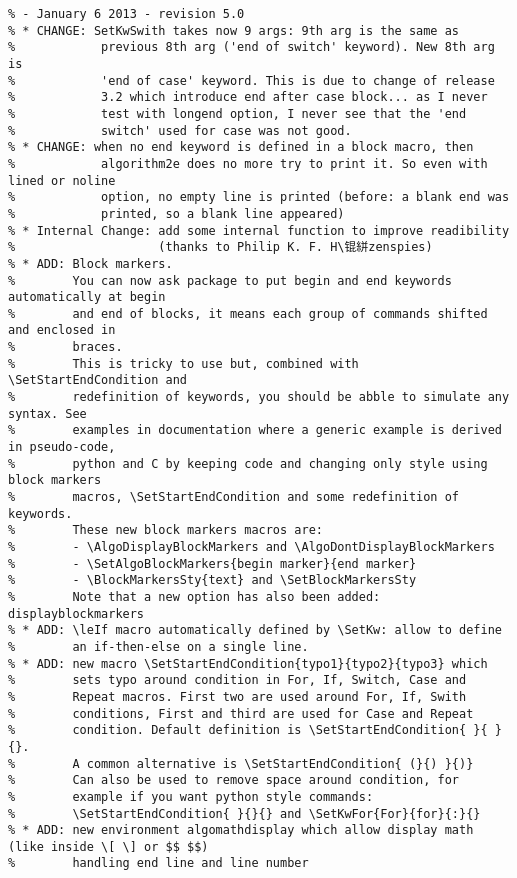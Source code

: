 \documentclass[a4paper]{article}
\begin{document}
\begin{verbatim}
% - January 6 2013 - revision 5.0
% * CHANGE: SetKwSwith takes now 9 args: 9th arg is the same as
%            previous 8th arg ('end of switch' keyword). New 8th arg is
%            'end of case' keyword. This is due to change of release
%            3.2 which introduce end after case block... as I never
%            test with longend option, I never see that the 'end
%            switch' used for case was not good.
% * CHANGE: when no end keyword is defined in a block macro, then
%            algorithm2e does no more try to print it. So even with lined or noline
%            option, no empty line is printed (before: a blank end was
%            printed, so a blank line appeared)
% * Internal Change: add some internal function to improve readibility
%                    (thanks to Philip K. F. H\锟絣zenspies)
% * ADD: Block markers. 
%        You can now ask package to put begin and end keywords automatically at begin
%        and end of blocks, it means each group of commands shifted and enclosed in
%        braces.
%        This is tricky to use but, combined with \SetStartEndCondition and
%        redefinition of keywords, you should be abble to simulate any syntax. See
%        examples in documentation where a generic example is derived in pseudo-code,
%        python and C by keeping code and changing only style using block markers
%        macros, \SetStartEndCondition and some redefinition of keywords.
%        These new block markers macros are:
%        - \AlgoDisplayBlockMarkers and \AlgoDontDisplayBlockMarkers
%        - \SetAlgoBlockMarkers{begin marker}{end marker}
%        - \BlockMarkersSty{text} and \SetBlockMarkersSty
%        Note that a new option has also been added: displayblockmarkers
% * ADD: \leIf macro automatically defined by \SetKw: allow to define
%        an if-then-else on a single line.
% * ADD: new macro \SetStartEndCondition{typo1}{typo2}{typo3} which
%        sets typo around condition in For, If, Switch, Case and
%        Repeat macros. First two are used around For, If, Swith
%        conditions, First and third are used for Case and Repeat
%        condition. Default definition is \SetStartEndCondition{ }{ }{}.
%        A common alternative is \SetStartEndCondition{ (}{) }{)}
%        Can also be used to remove space around condition, for
%        example if you want python style commands:
%        \SetStartEndCondition{ }{}{} and \SetKwFor{For}{for}{:}{}
% * ADD: new environment algomathdisplay which allow display math (like inside \[ \] or $$ $$) 
%        handling end line and line number

\end{verbatim}
\end{document}
